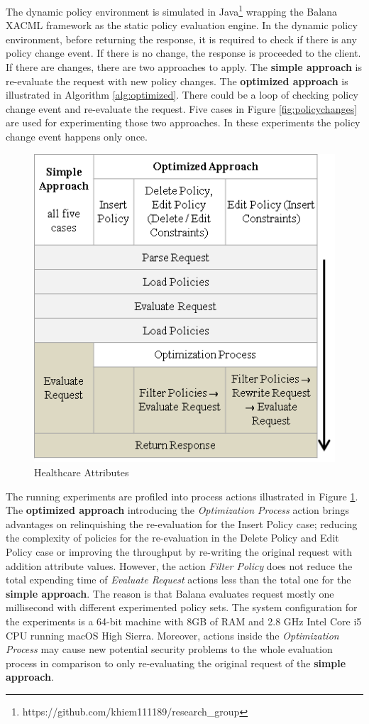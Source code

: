 \documentclass[conference]{IEEEtran}
\begin{document}
The dynamic policy environment is simulated in Java\footnote{https://github.com/khiem111189/research\_group} wrapping the Balana XACML framework as the static policy evaluation engine.
In the dynamic policy environment, before returning the response, it is required to check if there is any policy change event.
If there is no change, the response is proceeded to the client.
If there are changes, there are two approaches to apply.
The \textbf{simple approach} is re-evaluate the request with new policy changes.
The \textbf{optimized approach} is illustrated in Algorithm \ref{alg:optimized}.
There could be a loop of checking policy change event and re-evaluate the request.
Five cases in Figure \ref{fig:policychanges} are used for experimenting those two approaches.
In these experiments the policy change event happens only once.

\begin{figure}[ht!]
	\label{fig:actions}
	\centering
	\includegraphics[scale=0.8]{fig/actions.png}
	\caption{Healthcare Attributes}
\end{figure}

The running experiments are profiled into process actions illustrated in Figure \ref{fig:actions}.
The \textbf{optimized approach} introducing the \textit{Optimization Process} action brings advantages on relinquishing the re-evaluation for the Insert Policy case; reducing the complexity of policies for the re-evaluation in the Delete Policy and Edit Policy case or improving the throughput by re-writing the original request with addition attribute values.
However, the action \textit{Filter Policy} does not reduce the total expending time of \textit{Evaluate Request} actions less than the total one for the \textbf{simple approach}.
The reason is that Balana evaluates request mostly one millisecond with different experimented policy sets.
The system configuration for the experiments is a 64-bit machine with 8GB of RAM and 2.8 GHz Intel Core i5 CPU running macOS High Sierra.
Moreover, actions inside the \textit{Optimization Process} may cause new potential security problems to the whole evaluation process in comparison to only re-evaluating the original request of the \textbf{simple approach}.
\end{document}
